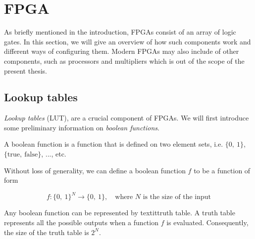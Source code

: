 \chapter{FPGA\label{FPGA}}
As briefly mentioned in the introduction, FPGAs consist of an array of logic
gates. In this section, we will give an overview of how such components work and
different ways of configuring them. Modern FPGAs may also include of other
components, such as processors and multipliers which is out of the scope of
the present thesis.



\section{Lookup tables}

\textit{Lookup tables} (LUT), are a crucial component of FPGAs. We will first
introduce some preliminary information on \textit{boolean functions}.

\begin{definition}
    A boolean function is a function that is defined on two element sets, i.e.
    $\{0,\ 1\}$, $\{\text{true},\ \text{false}\}$, ..., etc.

    Without loss of generality, we can define a boolean function $f$ to be a
    function of form

    \[f \colon \{0,\ 1\}^N \rightarrow \{0,\ 1\}, \quad \text{where $N$ is the
    size of the input}\]

    Any boolean function can be represented by \a textit{truth table}. A truth
    table represents all the possible outputs when a function $f$ is evaluated.
    Consequently, the size of the truth table is $2^N$.
\end{definition}


